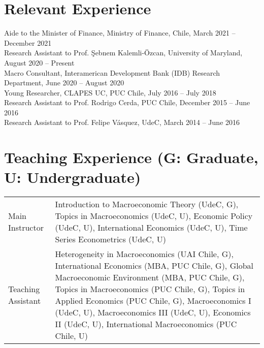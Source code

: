 \documentclass[11pt]{article}
\begin{document}




\section*{Relevant Experience}


Aide to the Minister of Finance, Ministry of Finance, Chile, March 2021 -- December 2021 \\
Research Assistant to Prof. \c{S}ebnem Kalemli-\"{O}zcan, University of Maryland, August 2020 -- Present\\
Macro Consultant, Interamerican Development Bank (IDB) Research Department, June 2020 -- August 2020\\
Young Researcher, CLAPES UC, PUC Chile, July 2016 -- July 2018\\
Research Assistant to Prof. Rodrigo Cerda, PUC Chile, December 2015 -- June 2016\\
Research Assistant to Prof. Felipe V\'asquez, UdeC, March 2014 -- June 2016



\section*{Teaching Experience (\footnotesize G: Graduate, U: Undergraduate)}


\begin{tabular}{@{}lp{13cm}}
Main Instructor& Introduction to Macroeconomic Theory (UdeC, G), Topics in Macroeconomics (UdeC, U), Economic Policy (UdeC, U), International Economics (UdeC, U), Time Series Econometrics (UdeC, U)\\
Teaching Assistant& Heterogeneity in Macroeconomics (UAI Chile, G), International Economics (MBA, PUC Chile, G), Global Macroeconomic Environment (MBA, PUC Chile, G), Topics in Macroeconomics (PUC Chile, G), Topics in Applied Economics (PUC Chile, G), Macroeconomics I (UdeC, U), Macroeconomics III (UdeC, U), Economics II (UdeC, U), International Macroeconomics (PUC Chile, U)
\end{tabular}
\end{document}
